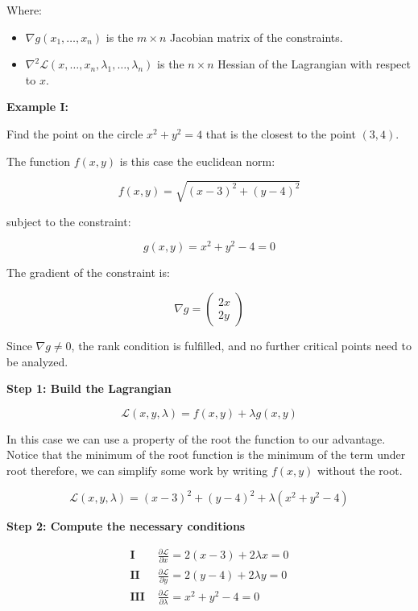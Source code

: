 Where:

\begin{itemize}

    \item \( \nabla  g(x_1, \dots, x_n) \) is the \( m \times n \) Jacobian matrix of the constraints.

    \item \( \nabla^2 \mathcal{L}(x, \dots, x_n, \lambda_1, \dots, \lambda_n) \) is the \( n \times n \) 
          Hessian of the Lagrangian with respect to \(x\).

\end{itemize}

\textbf{Example I:}

Find the point on the circle \(x^2 + y^2 = 4\) that is the closest to the point \((3,4)\).

The function \(f(x,y)\) is this case the euclidean norm:

\[
    f(x, y) = \sqrt{(x - 3)^2 + (y - 4)^2}
\]

subject to the constraint:

\[
    g(x, y) = x^2 + y^2 - 4 = 0
\]

The gradient of the constraint is:

\[
    \nabla g = \begin{pmatrix} 2x \\ 2y \end{pmatrix}
\]

Since \( \nabla g \ne 0 \), the rank condition is fulfilled, and no further critical points 
need to be analyzed.

\textbf{Step 1: Build the Lagrangian}

\[
    \mathcal{L}(x, y, \lambda) = f(x, y) + \lambda g(x, y)
\]

In this case we can use a property of the root the function to our advantage. Notice that the minimum 
of the root function is the minimum of the term under root therefore, we can simplify some work by writing 
\(f(x,y)\) without the root. 

\[
    \mathcal{L}(x, y, \lambda) = (x - 3)^2 + (y - 4)^2 + \lambda (x^2 + y^2 - 4)
\]

\textbf{Step 2: Compute the necessary conditions}

\begin{align*}
   \textbf{I } &\frac{\partial \mathcal{L}}{\partial x} = 2(x - 3) + 2\lambda x = 0 \\
   \textbf{II } &\frac{\partial \mathcal{L}}{\partial y} = 2(y - 4) + 2\lambda y = 0 \\
   \textbf{III } &\frac{\partial \mathcal{L}}{\partial \lambda} = x^2 + y^2 - 4 = 0
\end{align*}

